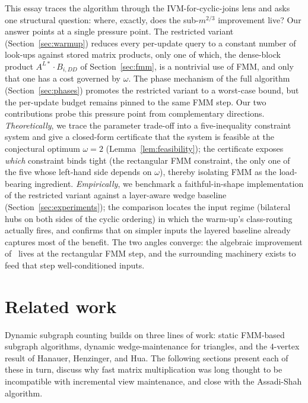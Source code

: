 \documentclass[sigconf,nonacm]{acmart}
\theoremstyle{plain}
\theoremstyle{definition}
\begin{document}
This essay traces the algorithm through the IVM-for-cyclic-joins
lens and asks one structural question: where, exactly, does the
sub-$m^{2/3}$ improvement live? Our answer points at a single
pressure point. The restricted variant (Section~\ref{sec:warmup})
reduces every per-update query to a constant number of look-ups
against stored matrix products, only one of which, the
dense-block product $A^{L*}\!\cdot\!B_{i,DD}$ of
Section~\ref{sec:fmm}, is a nontrivial use of FMM, and only that
one has a cost governed by $\omega$. The phase mechanism of the
full algorithm (Section~\ref{sec:phases}) promotes the restricted
variant to a worst-case bound, but the per-update budget remains
pinned to the same FMM step. Our two contributions probe this
pressure point from complementary directions.
\emph{Theoretically}, we trace the parameter trade-off into a
five-inequality constraint system and give a closed-form
certificate that the system is feasible at the conjectural optimum
$\omega = 2$ (Lemma~\ref{lem:feasibility}); the certificate exposes
\emph{which} constraint binds tight (the rectangular FMM
constraint, the only one of the five whose left-hand side depends
on $\omega$), thereby isolating FMM as the load-bearing ingredient.
\emph{Empirically}, we benchmark a faithful-in-shape implementation
of the restricted variant against a layer-aware wedge baseline
(Section~\ref{sec:experiments}); the comparison locates the input
regime (bilateral hubs on both sides of the cyclic ordering)
in which the warm-up's class-routing actually fires, and confirms
that on simpler inputs the layered baseline already captures most
of the benefit. The two angles converge: the algebraic improvement
of~\cite{AssadiShah25} lives at the rectangular FMM step, and the
surrounding machinery exists to feed that step well-conditioned
inputs.

\section{Related work}
\label{sec:related}

Dynamic subgraph counting builds on three lines of
work: static FMM-based subgraph algorithms, dynamic
wedge-maintenance for triangles, and the $4$-vertex result of
Hanauer, Henzinger, and Hua. The following sections present each
of these in turn, discuss why fast matrix multiplication was long
thought to be incompatible with incremental view maintenance, and
close with the Assadi-Shah algorithm.
\end{document}

